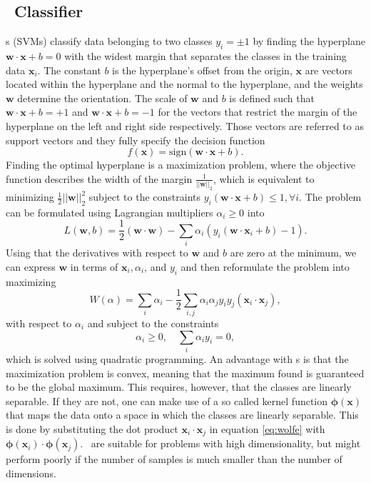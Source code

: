 \subsection{\svm\ Classifier}
\label{sec:theory_svm}
\svm s (SVMs) classify data belonging to two classes $y_i = \pm 1$ by finding the hyperplane $\boldsymbol{w} \cdot \boldsymbol{x} + b = 0$ with the widest margin that separates the classes in the training data $\boldsymbol{x}_i$. The constant $b$ is the hyperplane's offset from the origin, $\boldsymbol{x}$ are vectors located within the hyperplane and the normal to the hyperplane, and the weights $\boldsymbol{w}$ determine the orientation. The scale of $\boldsymbol{w}$ and $b$ is defined such that $\boldsymbol{w} \cdot \boldsymbol{x} + b = +1$ and $\boldsymbol{w} \cdot \boldsymbol{x} + b = -1$ for the vectors that restrict the margin of the hyperplane on the left and right side respectively. Those vectors are referred to as support vectors and they fully specify the decision function
\[
f(\boldsymbol{x}) = \text{sign}(\boldsymbol{w}\cdot \boldsymbol{x} + b).
\]
Finding the optimal hyperplane is a maximization problem, where the objective function describes the width of the margin $\frac{1}{||\boldsymbol{w}||_2}$, which is equivalent to minimizing $\frac{1}{2}||\boldsymbol{w}||_2^2$ subject to the constraints $y_i (\boldsymbol{w}\cdot \boldsymbol{x} + b)\leq 1, \forall i$. The problem can be formulated using Lagrangian multipliers $\alpha_i \geq 0$ into
\[
L(\boldsymbol{w},b) = \frac{1}{2}(\boldsymbol{w} \cdot \boldsymbol{w}) - \sum_i \alpha_i (y_i (\boldsymbol{w} \cdot \boldsymbol{x}_i + b) - 1).
\]
Using that the derivatives with respect to $\boldsymbol{w}$ and $b$ are zero at the minimum, we can express $\boldsymbol{w}$ in terms of $\boldsymbol{x}_i, \alpha_i$, and $y_i$ and then reformulate the problem into maximizing
\begin{equation}
W(\alpha) = \sum_i \alpha_i - \frac{1}{2} \sum_{i,j} \alpha_i \alpha_j y_i y_j (\boldsymbol{x}_i \cdot \boldsymbol{x}_j),
\label{eq:wolfe}
\end{equation}
with respect to $\alpha_i$ and subject to the constraints
\[
\alpha_i \geq 0, \quad \sum_i \alpha_i y_i = 0,
\]
which is solved using quadratic programming. An advantage with \svm s is that the maximization problem is convex, meaning that the maximum found is guaranteed to be the global maximum. This requires, however, that the classes are linearly separable. If they are not, one can make use of a so called kernel function $\boldsymbol{\phi}(\boldsymbol{x})$ that maps the data onto a space in which the classes are linearly separable. This is done by substituting the dot product $\boldsymbol{x}_i \cdot \boldsymbol{x}_j$ in equation \eqref{eq:wolfe} with $\boldsymbol{\phi}(\boldsymbol{x}_i) \cdot \boldsymbol{\phi}(\boldsymbol{x}_j)$. \svm\ are suitable for problems with high dimensionality, but might perform poorly if the number of samples is much smaller than the number of dimensions. \cite{Campbell11SVM}
